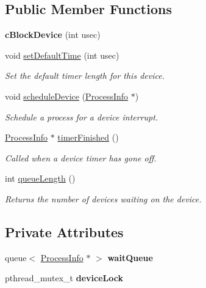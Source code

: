 \subsection*{\-Public \-Member \-Functions}
\begin{DoxyCompactItemize}
\item 
\hypertarget{classcBlockDevice_a640cb07a008538d19d6d39696b175e09}{{\bfseries c\-Block\-Device} (int usec)}\label{dd/d36/classcBlockDevice_a640cb07a008538d19d6d39696b175e09}

\item 
void \hyperlink{classcBlockDevice_ab6daadb251c1c59aca70bdc1f73fcb62}{set\-Default\-Time} (int usec)
\begin{DoxyCompactList}\small\item\em \-Set the default timer length for this device. \end{DoxyCompactList}\item 
void \hyperlink{classcBlockDevice_a2b1bae22bb9474fb140faefc1bed6525}{schedule\-Device} (\hyperlink{structProcessInfo}{\-Process\-Info} $\ast$)
\begin{DoxyCompactList}\small\item\em \-Schedule a process for a device interrupt. \end{DoxyCompactList}\item 
\hyperlink{structProcessInfo}{\-Process\-Info} $\ast$ \hyperlink{classcBlockDevice_a65f11097ece15c840c15aa7e6086d94d}{timer\-Finished} ()
\begin{DoxyCompactList}\small\item\em \-Called when a device timer has gone off. \end{DoxyCompactList}\item 
\hypertarget{classcBlockDevice_a94ce11ed6420b152ad1cec5648262a78}{int \hyperlink{classcBlockDevice_a94ce11ed6420b152ad1cec5648262a78}{queue\-Length} ()}\label{dd/d36/classcBlockDevice_a94ce11ed6420b152ad1cec5648262a78}

\begin{DoxyCompactList}\small\item\em \-Returns the number of devices waiting on the device. \end{DoxyCompactList}\end{DoxyCompactItemize}
\subsection*{\-Private \-Attributes}
\begin{DoxyCompactItemize}
\item 
\hypertarget{classcBlockDevice_a974100450cc04f4b2ab8fbf419b51f2d}{queue$<$ \hyperlink{structProcessInfo}{\-Process\-Info} $\ast$ $>$ {\bfseries wait\-Queue}}\label{dd/d36/classcBlockDevice_a974100450cc04f4b2ab8fbf419b51f2d}

\item 
\hypertarget{classcBlockDevice_a6682a95bc2a71aeaa6a9ce75f07b0fa6}{pthread\-\_\-mutex\-\_\-t {\bfseries device\-Lock}}\label{dd/d36/classcBlockDevice_a6682a95bc2a71aeaa6a9ce75f07b0fa6}

\end{DoxyCompactItemize}


